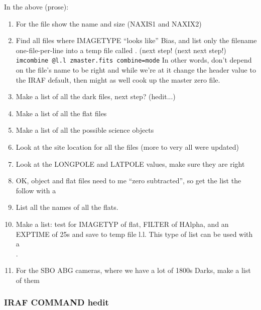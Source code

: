 In the above (prose):

\vspace{-.15cm}
\begin{enumerate}[resume]\addtolength{\itemsep}{-0.5\baselineskip}
   \item   For the file {\color{verbcolor}{\verb#c_Flat_0011.fits#}} show the name
and size (NAXIS1 and NAXIX2)
   \item   Find all files where IMAGETYPE ``looks like'' Bias, and list only the
filename {\color{verbcolor}{\verb#($I)#}} one-file-per-line into a
temp file called {\color{verbcolor}{\verb#l.l#}}.
(next step! {\color{verbcolor}{\verb#hedit @l.l IMAGETYP zero add+ ver- show- update+#}}
(next next step!) {\color{verbcolor}\\
{\verb#imcombine @l.l zmaster.fits combine=mode#}}
In other words, don't depend on the file's name to be right and while we're at it
change the header value to the IRAF default, then might as well cook up the
master zero file.
   \item   Make a list of all the dark files, next step? (hedit...)
   \item   Make a list of all the flat files
   \item   Make a list of  all the possible science objects
   \item   Look at the site location for all the files (more to very all were updated)
   \item   Look at the LONGPOLE and LATPOLE values, make sure they are right
   \item   OK, object and flat files need to me ``zero subtracted'', so get the list
the follow with a \\
{\color{verbcolor}{\verb#imarith @l.l - zmaster.fits z_@l.l#}}
   \item   List all the names of all the flats.
   \item   Make a list: test for IMAGETYP of flat, FILTER of HAlpha, and an EXPTIME of 25s
and save to temp file l.l. This type of list can be used with a \\
{\color{verbcolor}{\verb#imcombine @l.l flatmaster.fits ...#}} .
   \item   For the SBO ABG cameras, where we have a lot of 1800s Darks, make a list of them
\end{enumerate}
\clearpage
\subsubsection{IRAF COMMAND hedit}
\begin{quote}
{\color{verbcolor}{\verb#hedit listoffiles keyword newvalue switches#}}
\end{quote}

